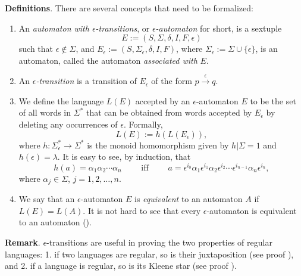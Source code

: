 \documentclass[12pt]{article}
\begin{document}
\textbf{Definitions}.  There are several concepts that need to be formalized:
\begin{enumerate}
\item
An \emph{automaton with $\epsilon$-transitions}, or \emph{$\epsilon$-automaton} for short, is a sextuple $$E:=(S,\Sigma,\delta,I,F,\epsilon)$$ such that $\epsilon\notin \Sigma$, and $E_{\epsilon}:=(S,\Sigma_{\epsilon}, \delta,I,F)$, where $\Sigma_{\epsilon}:=\Sigma\cup \lbrace \epsilon\rbrace$, is an automaton, called the automaton \emph{associated with} $E$.
\item
An \emph{$\epsilon$-transition} is a transition of $E_{\epsilon}$ of the form $p\stackrel{\epsilon}{\longrightarrow} q$.
\item
We define the language $L(E)$ accepted by an $\epsilon$-automaton $E$ to be the set of all words in $\Sigma^*$ that can be obtained from words accepted by $E_{\epsilon}$ by deleting any occurrences of $\epsilon$.  Formally, $$L(E):=h(L(E_{\epsilon})),$$ where $h:\Sigma_{\epsilon}^*\to \Sigma^*$ is the monoid homomorphism given by $h|\Sigma=1$ and $h(\epsilon)=\lambda$.  It is easy to see, by induction, that $$h(a)=\alpha_1\alpha_2\cdots \alpha_n \qquad \mbox{ iff } \qquad a= \epsilon^{i_0}\alpha_1\epsilon^{i_1}\alpha_2 \epsilon^{i_2}\cdots \epsilon^{i_{n-1}}\alpha_n \epsilon^{i_n},$$ where $\alpha_j\in \Sigma$, $j=1,2,\ldots,n$.
\item
We say that an $\epsilon$-automaton $E$ is \emph{equivalent} to an automaton $A$ if $L(E)=L(A)$.  It is not hard to see that every $\epsilon$-automaton is equivalent to an automaton ().
\end{enumerate}

\textbf{Remark}.  $\epsilon$-transitions are useful in proving the two properties of regular languages: 1. if two languages are regular, so is their juxtaposition (see proof ), and 2. if a language is regular, so is its Kleene star (see proof ).
\end{document}
